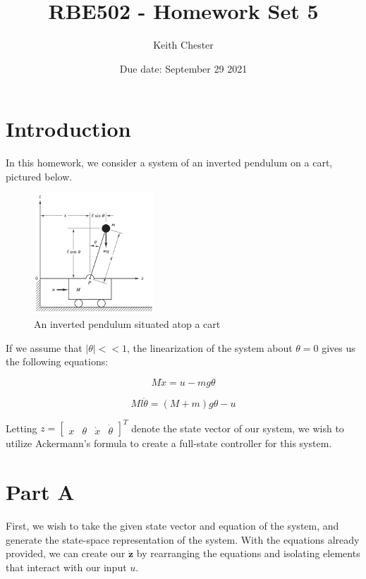 \documentclass{article}
\title{RBE502 - Homework Set 5}
\author{Keith Chester}
\date{Due date: September 29 2021}
\begin{document}
\maketitle

\section*{Introduction}

In this homework, we consider a system of an inverted pendulum on a cart, pictured below.

\begin{figure}[H]
    \centering
    \includegraphics[width = 0.4\textwidth]{figures/cart-pole.png}
    \caption{An inverted pendulum situated atop a cart}
    \label{fig:cart-pole}
\end{figure}

If we assume that $|\theta| << 1$, the linearization of the system about $\theta=0$ gives us the following equations:

\begin{equation}
    M\ddot{x} = u-mg\theta
\end{equation}

\begin{equation}
    Ml\ddot{\theta}=(M+m)g\theta-u
\end{equation}

Letting $z = \begin{bmatrix} x & \theta & \dot{x} & \dot{\theta} \end{bmatrix}^T$ denote the state vector of our system, we wish to utilize Ackermann's formula to create a full-state controller for this system.


\section*{Part A}

First, we wish to take the given state vector and equation of the system, and generate the state-space representation of the system. With the equations already provided, we can create our $\dot{\boldsymbol{z}}$ by rearranging the equations and isolating elements that interact with our input $u$.
\end{document}
